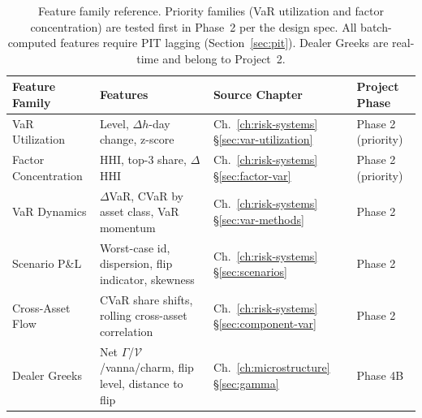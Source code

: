 \begin{table}[ht]
\centering
\small
\begin{tabular}{@{}p{2.6cm}p{4.5cm}p{2.8cm}p{2.8cm}@{}}
\toprule
\textbf{Feature Family} & \textbf{Features} &
  \textbf{Source Chapter} & \textbf{Project Phase} \\
\midrule
VaR Utilization
  & Level, $\Delta h$-day change, z-score
  & Ch.~\ref{ch:risk-systems} \S\ref{sec:var-utilization}
  & Phase 2 (priority) \\[6pt]

Factor Concentration
  & HHI, top-3 share, $\Delta$HHI
  & Ch.~\ref{ch:risk-systems} \S\ref{sec:factor-var}
  & Phase 2 (priority) \\[6pt]

VaR Dynamics
  & $\Delta$VaR, CVaR by asset class, VaR momentum
  & Ch.~\ref{ch:risk-systems} \S\ref{sec:var-methods}
  & Phase 2 \\[6pt]

Scenario P\&L
  & Worst-case id, dispersion, flip indicator, skewness
  & Ch.~\ref{ch:risk-systems} \S\ref{sec:scenarios}
  & Phase 2 \\[6pt]

Cross-Asset Flow
  & CVaR share shifts, rolling cross-asset correlation
  & Ch.~\ref{ch:risk-systems} \S\ref{sec:component-var}
  & Phase 2 \\[6pt]

Dealer Greeks
  & Net $\Gamma$/$\mathcal{V}$/vanna/charm, flip level,
    distance to flip
  & Ch.~\ref{ch:microstructure} \S\ref{sec:gamma}
  & Phase 4B \\
\bottomrule
\end{tabular}
\caption{Feature family reference.  Priority families (VaR utilization
  and factor concentration) are tested first in Phase~2 per the design
  spec.  All batch-computed features require PIT lagging
  (Section~\ref{sec:pit}).  Dealer Greeks are real-time and belong to
  Project~2.}
\label{tab:feature-families}
\end{table}

\vspace{1em}


